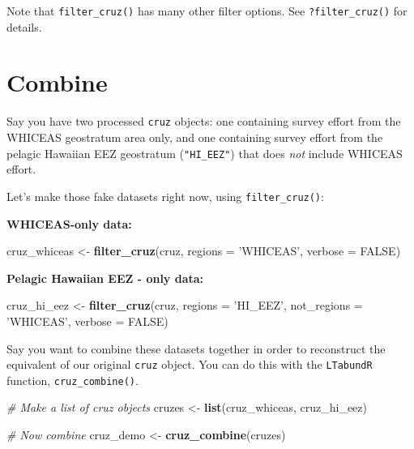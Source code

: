 \documentclass[
]{book}
\newenvironment{Shaded}{\begin{snugshade}}{\end{snugshade}}
\newcommand{\CommentTok}[1]{\textcolor[rgb]{0.56,0.35,0.01}{\textit{#1}}}
\newcommand{\DataTypeTok}[1]{\textcolor[rgb]{0.13,0.29,0.53}{#1}}
\newcommand{\KeywordTok}[1]{\textcolor[rgb]{0.13,0.29,0.53}{\textbf{#1}}}
\newcommand{\NormalTok}[1]{#1}
\newcommand{\OtherTok}[1]{\textcolor[rgb]{0.56,0.35,0.01}{#1}}
\newcommand{\StringTok}[1]{\textcolor[rgb]{0.31,0.60,0.02}{#1}}
\begin{document}
Note that \texttt{filter\_cruz()} has many other filter options. See \texttt{?filter\_cruz()} for details.

\hypertarget{combine}{%
\section*{Combine}\label{combine}}

Say you have two processed \texttt{cruz} objects: one containing survey effort from the WHICEAS geostratum area only, and one containing survey effort from the pelagic Hawaiian EEZ geostratum (\texttt{"HI\_EEZ"}) that does \emph{not} include WHICEAS effort.

Let's make those fake datasets right now, using \texttt{filter\_cruz()}:

\textbf{WHICEAS-only data:}

\begin{Shaded}
\begin{Highlighting}[]
\NormalTok{cruz_whiceas <-}\StringTok{ }\KeywordTok{filter_cruz}\NormalTok{(cruz, }
                            \DataTypeTok{regions =} \StringTok{'WHICEAS'}\NormalTok{, }
                            \DataTypeTok{verbose =} \OtherTok{FALSE}\NormalTok{)}
\end{Highlighting}
\end{Shaded}

\textbf{Pelagic Hawaiian EEZ - only data:}

\begin{Shaded}
\begin{Highlighting}[]
\NormalTok{cruz_hi_eez <-}\StringTok{ }\KeywordTok{filter_cruz}\NormalTok{(cruz, }
                           \DataTypeTok{regions =} \StringTok{'HI_EEZ'}\NormalTok{, }
                           \DataTypeTok{not_regions =} \StringTok{'WHICEAS'}\NormalTok{, }
                           \DataTypeTok{verbose =} \OtherTok{FALSE}\NormalTok{)}
\end{Highlighting}
\end{Shaded}

Say you want to combine these datasets together in order to reconstruct the equivalent of our original \texttt{cruz} object. You can do this with the \texttt{LTabundR} function, \texttt{cruz\_combine()}.

\begin{Shaded}
\begin{Highlighting}[]
\CommentTok{# Make a list of cruz objects}
\NormalTok{cruzes <-}\StringTok{ }\KeywordTok{list}\NormalTok{(cruz_whiceas, cruz_hi_eez)}

\CommentTok{# Now combine}
\NormalTok{cruz_demo <-}\StringTok{ }\KeywordTok{cruz_combine}\NormalTok{(cruzes)}
\end{Highlighting}
\end{Shaded}
\end{document}
